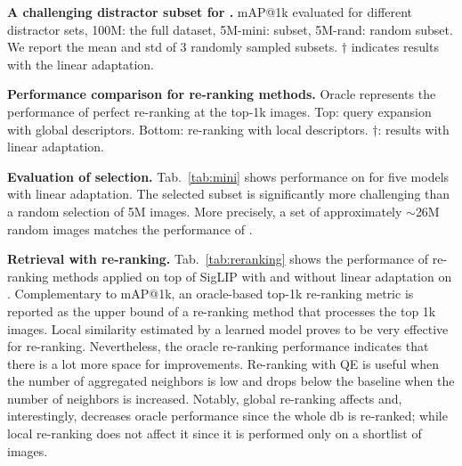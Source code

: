 \begin{table}[t]
  \centering
  \scalebox{0.85}{
    
  }
  \vspace{-7pt}
  \caption{\textbf{A challenging distractor subset for \miniours.} mAP@1k evaluated for different distractor sets, 100M: the full dataset, 5M-mini: \miniours subset, 5M-rand: random subset. We report the mean and std of 3 randomly sampled subsets. $\dagger$ indicates results with the linear adaptation.
  \label{tab:mini}}
  \vspace{-10pt}
\end{table}
\begin{table}[h!]
  \centering
  \scalebox{0.85}{
    
  }
  \vspace{-7pt}
  \caption{\textbf{Performance comparison for re-ranking methods.} Oracle represents the performance of perfect re-ranking at the top-1k images. Top: query expansion with global descriptors. Bottom: re-ranking with local descriptors. $\dagger$: results with linear adaptation.
  \label{tab:reranking}}
  \vspace{-20pt}
\end{table}

\noindent\textbf{Evaluation of \miniours selection.} Tab.~\ref{tab:mini} shows performance on \miniours for five models with linear adaptation. 
The selected subset is significantly more challenging than a random selection of 5M images. 
More precisely, a set of approximately $\sim$26M random images matches the performance of \miniours. 

\noindent\textbf{Retrieval with re-ranking.} Tab.~\ref{tab:reranking} shows the performance of re-ranking methods applied on top of SigLIP with and without linear adaptation on \ours. Complementary to mAP@1k, an oracle-based top-1k re-ranking metric is reported as the upper bound of a re-ranking method that processes the top 1k images.
Local similarity estimated by a learned model proves to be very effective for re-ranking. Nevertheless, the oracle re-ranking performance indicates that there is a lot more space for improvements. Re-ranking with QE is useful when the number of aggregated neighbors is low and drops below the baseline when the number of neighbors is increased. 
Notably, global re-ranking affects and, interestingly, decreases oracle performance since the whole db is re-ranked; while local re-ranking does not affect it since it is performed only on a shortlist of images.


